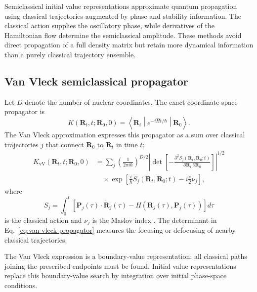 \documentclass[
  11pt,
  letterpaper,
  onehalfspacing,
  normalmargins,
  equalmargins,
  oneside
]{ut-thesis}
\begin{document}
Semiclassical initial value representations approximate quantum propagation
using classical trajectories augmented by phase and stability information.
The classical action supplies the oscillatory phase, while derivatives of the
Hamiltonian flow determine the semiclassical amplitude. These methods avoid
direct propagation of a full density matrix but retain more dynamical
information than a purely classical trajectory ensemble.


\subsection{Van Vleck semiclassical propagator}
\label{subsec:van-vleck-propagator}

Let \(D\) denote the number of nuclear coordinates. The exact coordinate-space
propagator is
\begin{equation}
K(\mathbf R_t,t;\mathbf R_0,0)
=
\left\langle
\mathbf R_t
\middle|
e^{-i\hat Ht/\hbar}
\middle|
\mathbf R_0
\right\rangle.
\label{eq:exact-coordinate-propagator}
\end{equation}
The Van Vleck approximation expresses this propagator as a sum over classical
trajectories \(j\) that connect \(\mathbf R_0\) to \(\mathbf R_t\) in time
\(t\):
\begin{align}
K_{\mathrm{vV}}(\mathbf R_t,t;\mathbf R_0,0)
&=
\sum_j
\left(
\frac{1}{2\pi i\hbar}
\right)^{D/2}
\left|
\det\left[
-
\frac{\partial^2S_j(\mathbf R_t,\mathbf R_0;t)}
{\partial\mathbf R_t\,\partial\mathbf R_0}
\right]
\right|^{1/2}
\nonumber\\
&\quad\times
\exp\left[
\frac{i}{\hbar}S_j(\mathbf R_t,\mathbf R_0;t)
-i\frac{\pi}{2}\nu_j
\right],
\label{eq:van-vleck-propagator}
\end{align}
where
\begin{equation}
S_j
=
\int_0^t
\left[
\mathbf P_j(\tau)\cdot\dot{\mathbf R}_j(\tau)
-
H(\mathbf R_j(\tau),\mathbf P_j(\tau))
\right]d\tau
\label{eq:classical-action}
\end{equation}
is the classical action and \(\nu_j\) is the Maslov index
\cite{VanVleck1928,Miller2001}. The determinant in
Eq.~\eqref{eq:van-vleck-propagator} measures the focusing or defocusing of
nearby classical trajectories.

The Van Vleck expression is a boundary-value representation: all classical
paths joining the prescribed endpoints must be found. Initial value
representations replace this boundary-value search by integration over
initial phase-space conditions.
\end{document}

